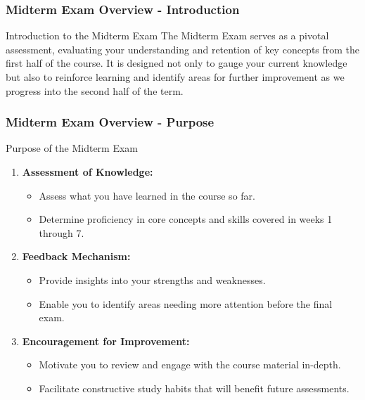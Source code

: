 \documentclass[aspectratio=169]{beamer}
\begin{document}
\frame{\titlepage}

\begin{frame}[fragile]
    \frametitle{Midterm Exam Overview - Introduction}
    \begin{block}{Introduction to the Midterm Exam}
        The Midterm Exam serves as a pivotal assessment, evaluating your understanding and retention of key concepts from the first half of the course. 
        It is designed not only to gauge your current knowledge but also to reinforce learning and identify areas for further improvement as we progress into the second half of the term.
    \end{block}
\end{frame}

\begin{frame}[fragile]
    \frametitle{Midterm Exam Overview - Purpose}
    \begin{block}{Purpose of the Midterm Exam}
        \begin{enumerate}
            \item \textbf{Assessment of Knowledge:}
            \begin{itemize}
                \item Assess what you have learned in the course so far.
                \item Determine proficiency in core concepts and skills covered in weeks 1 through 7.
            \end{itemize}

            \item \textbf{Feedback Mechanism:}
            \begin{itemize}
                \item Provide insights into your strengths and weaknesses.
                \item Enable you to identify areas needing more attention before the final exam.
            \end{itemize}

            \item \textbf{Encouragement for Improvement:}
            \begin{itemize}
                \item Motivate you to review and engage with the course material in-depth.
                \item Facilitate constructive study habits that will benefit future assessments.
            \end{itemize}
        \end{enumerate}
    \end{block}
\end{frame}
\end{document}

